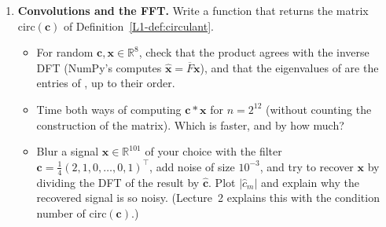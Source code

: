\begin{enumerate}[label=\textbf{P\arabic*.}, leftmargin=*]
\begin{lstlisting}
def solve_lu(L, U, b):
    # solve L U x = b by forward and back substitution
    ...
\end{lstlisting}
    \begin{itemize}
        \item Implement  by the elimination of Theorem~\ref{L1-thm:lu}: for each column, store the multipliers in $L$ and replace the rest of the matrix by its Schur complement. Check it on Example~\ref{L1-ex:lu}, and check that  equals $A$ for random $6 \times 6$ matrices.
        \item Implement , and compare it with  for random systems. For $A = \begin{pmatrix} 10^{-17} & 1 \\ 1 & 1 \end{pmatrix}$ and $\mathbf{b} = (1, 2)^\top$, the solution is very close to $(1, 1)$. What does your solver return, and why? Swapping the two rows first (partial pivoting) fixes the problem.
        \item For a random $200 \times 50$ data matrix $X$, compute $(X^\top X)^{-1}$. Then add $100$ new random rows one at a time, updating the inverse with the Sherman--Morrison formula of Theorem~\ref{L1-thm:woodbury}, and compare the result with $(X^\top X)^{-1}$ computed from scratch for the final matrix. Compare the running times of the two approaches.
    \end{itemize}

    \item \textbf{Convolutions and the FFT.} Write a function  that returns the matrix $\mathrm{circ}(\mathbf{c})$ of Definition~\ref{L1-def:circulant}.
    \begin{itemize}
        \item For random $\mathbf{c}, \mathbf{x} \in \mathbb{R}^8$, check that the product  agrees with the inverse DFT  (NumPy's  computes $\hat{\mathbf{x}} = \overline{F}\mathbf{x}$), and that the eigenvalues of  are the entries of , up to their order.
        \item Time both ways of computing $\mathbf{c} \ast \mathbf{x}$ for $n = 2^{12}$ (without counting the construction of the matrix). Which is faster, and by how much?
        \item Blur a signal $\mathbf{x} \in \mathbb{R}^{101}$ of your choice with the filter $\mathbf{c} = \frac{1}{4}(2, 1, 0, \ldots, 0, 1)^\top$, add noise of size $10^{-3}$, and try to recover $\mathbf{x}$ by dividing the DFT of the result by $\hat{\mathbf{c}}$. Plot $|\hat{c}_m|$ and explain why the recovered signal is so noisy. (Lecture~2 explains this with the condition number of $\mathrm{circ}(\mathbf{c})$.)
    \end{itemize}
\end{enumerate}
\endgroup
